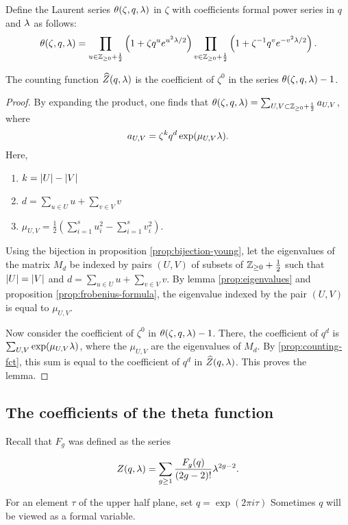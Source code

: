 \begin{defi}
 Define the Laurent series $\theta(\zeta,q,\lambda)$ in $\zeta$ with coefficients formal power series in $q$ and $\lambda$ as follows:
 \[
  \theta(\zeta,q,\lambda) = \prod_{u\in\mathbb{Z}_{\geq 0}+\frac{1}{2}} \left(1+\zeta q^u e^{u^2\lambda/2}\right) \prod_{v\in\mathbb{Z}_{\geq 0}+\frac{1}{2}} \left(1+\zeta^{-1} q^v e^{-v^2\lambda/2}\right).
 \]
\end{defi}

\begin{lemma} \label{prop:theta-expansion}
 The counting function $\widehat{Z}(q,\lambda)$ is the coefficient of $\zeta^0$ in the series $\theta(\zeta,q,\lambda)-1$.
\end{lemma}
\begin{proof}
 By expanding the product, one finds that $\theta(\zeta,q,\lambda)=\sum_{U,V\subset\mathbb{Z}_{\geq 0}+\frac{1}{2}}a_{U,V}$, where \[a_{U,V}=\zeta^k q^d \exp(\mu_{U,V}\lambda).\] Here, \begin{enumerate} \item $k=|U|-|V|$
 \item $d=\sum_{u\in U}u + \sum_{v\in V}v$
 \item $\mu_{U,V}=\frac{1}{2}\left(\sum_{i=1}^s u_i^2 - \sum_{i=1}^s v_i^2\right)$.
 \end{enumerate}
Using the bijection in proposition \ref{prop:bijection-young}, let the eigenvalues of the matrix $M_d$ be indexed by pairs $(U,V)$ of subsets of $\mathbb{Z}_{\geq 0}+\frac{1}{2}$ such that $|U|=|V|$ and $d=\sum_{u\in U}u + \sum_{v\in V}v$. By lemma \ref{prop:eigenvalues} and proposition \ref{prop:frobenius-formula}, the eigenvalue indexed by the pair $(U,V)$ is equal to $\mu_{U,V}$.

Now consider the coefficient of $\zeta^0$ in $\theta(\zeta,q,\lambda)-1$. There, the coefficient of $q^d$ is $\sum_{U,V}\exp({\mu_{U,V}\lambda})$, where the $\mu_{U,V}$ are the eigenvalues of $M_d$. By \ref{prop:counting-fct}, this sum is equal to the coefficient of $q^d$ in $\widehat{Z}(q,\lambda)$. This proves the lemma.
\end{proof}

\subsection{The coefficients of the theta function}

Recall that $F_g$ was defined as the series

 \[Z(q,\lambda) = \sum_{g\geq 1}\frac{F_g(q)}{(2g-2)!}\lambda^{2g-2}.\]
 
For an element $\tau$ of the upper half plane, set $q=\exp(2\pi i \tau)$ Sometimes $q$ will be viewed as a formal variable.

